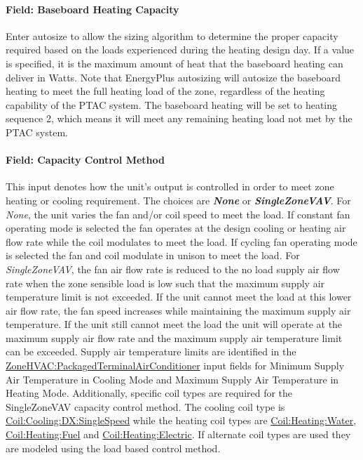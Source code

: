\paragraph{Field: Baseboard Heating Capacity}\label{field-baseboard-heating-capacity-2}

Enter autosize to allow the sizing algorithm to determine the proper capacity required based on the loads experienced during the heating design day. If a value is specified, it is the maximum amount of heat that the baseboard heating can deliver in Watts. Note that EnergyPlus autosizing will autosize the baseboard heating to meet the full heating load of the zone, regardless of the heating capability of the PTAC system. The baseboard heating will be set to heating sequence 2, which means it will meet any remaining heating load not met by the PTAC system.

\paragraph{Field: Capacity Control Method}

This input denotes how the unit's output is controlled in order to meet zone heating or cooling requirement. The choices are \textbf{\emph{None}} or \textbf{\emph{SingleZoneVAV}}. For \emph{None}, the unit varies the fan and/or coil speed to meet the load. If constant fan operating mode is selected the fan operates at the design cooling or heating air flow rate while the coil modulates to meet the load. If cycling fan operating mode is selected the fan and coil modulate in unison to meet the load. For \emph{SingleZoneVAV}, the fan air flow rate is reduced to the no load supply air flow rate when the zone sensible load is low such that the maximum supply air temperature limit is not exceeded. If the unit cannot meet the load at this lower air flow rate, the fan speed increases while maintaining the maximum supply air temperature. If the unit still cannot meet the load the unit will operate at the maximum supply air flow rate and the maximum supply air temperature limit can be exceeded. Supply air temperature limits are identified in the \hyperref[zonehvacpackagedterminalairconditioner]{ZoneHVAC:PackagedTerminalAirConditioner} input fields for Minimum Supply Air Temperature in Cooling Mode and Maximum Supply Air Temperature in Heating Mode. Additionally, specific coil types are required for the SingleZoneVAV capacity control method. The cooling coil type is \hyperref[coilcoolingdxsinglespeed]{Coil:Cooling:DX:SingleSpeed} while the heating coil types are \hyperref[coilheatingwater]{Coil:Heating:Water}, \hyperref[coilheatinggas-000]{Coil:Heating:Fuel} and \hyperref[coilheatingelectric]{Coil:Heating:Electric}. If alternate coil types are used they are modeled using the load based control method.


